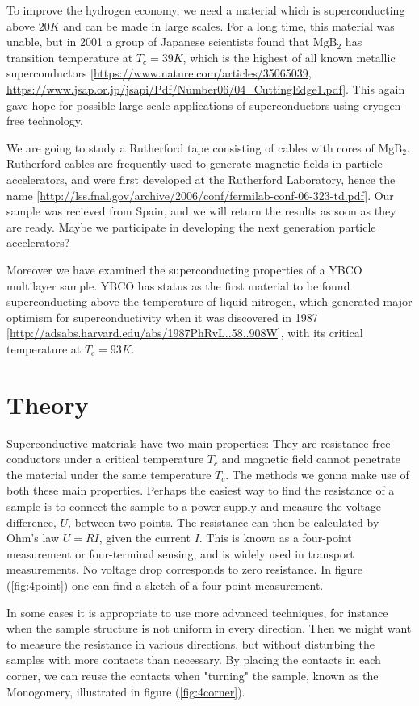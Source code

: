 \documentclass{comjnl}
\newcommand*\chem[1]{\ensuremath{\mathrm{#1}}}
\begin{document}
To improve the hydrogen economy, we need a material which is superconducting above $20K$ and can be made in large scales. For a long time, this material was unable, but in 2001 a group of Japanese scientists found that \chem{MgB_2} has transition temperature at $T_c=39K$, which is the highest of all known metallic superconductors [\url{https://www.nature.com/articles/35065039}, \url{https://www.jsap.or.jp/jsapi/Pdf/Number06/04_CuttingEdge1.pdf}]. This again gave hope for possible large-scale applications of superconductors using cryogen-free technology. 

We are going to study a Rutherford tape consisting of cables with cores of \chem{MgB_2}. Rutherford cables are frequently used to generate magnetic fields in particle accelerators, and were first developed at the Rutherford Laboratory, hence the name [\url{http://lss.fnal.gov/archive/2006/conf/fermilab-conf-06-323-td.pdf}]. Our sample was recieved from Spain, and we will return the results as soon as they are ready. Maybe we participate in developing the next generation particle accelerators?

Moreover we have examined the superconducting properties of a YBCO multilayer sample. YBCO has status as the first material to be found superconducting above the temperature of liquid nitrogen, which generated major optimism for superconductivity when it was discovered in 1987 [\url{http://adsabs.harvard.edu/abs/1987PhRvL..58..908W}], with its critical temperature at $T_c=93K$. 

\section{Theory}\label{Sec:Theory}
Superconductive materials have two main properties: They are resistance-free conductors under a critical temperature $T_c$ and magnetic field cannot penetrate the material under the same temperature $T_c$. The methods we gonna make use of both these main properties. Perhaps the easiest way to find the resistance of a sample is to connect the sample to a power supply and measure the voltage difference, $U$, between two points. The resistance can then be calculated by Ohm's law $U=RI$, given the current $I$. This is known as a four-point measurement or four-terminal sensing, and is widely used in transport measurements. No voltage drop corresponds to zero resistance. In figure (\ref{fig:4point}) one can find a sketch of a four-point measurement. 

In some cases it is appropriate to use more advanced techniques, for instance when the sample structure is not uniform in every direction. Then we might want to measure the resistance in various directions, but without disturbing the samples with more contacts than necessary. By placing the contacts in each corner, we can reuse the contacts when "turning" the sample, known as the Monogomery, illustrated in figure (\ref{fig:4corner}). 
\end{document}
